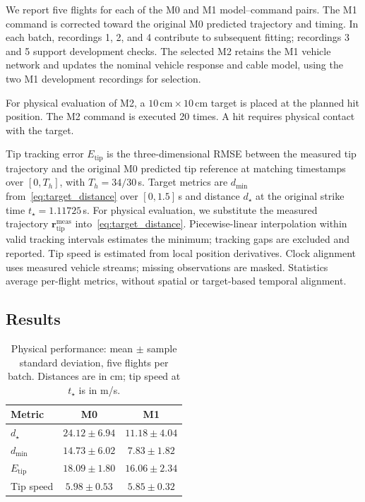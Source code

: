 \documentclass[letterpaper, 10 pt, conference]{ieeeconf}
\begin{document}
We report five flights for each of the M0 and M1 model--command
pairs. The M1 command is corrected toward the original M0
predicted trajectory and timing. In each batch, recordings 1, 2,
and 4 contribute to subsequent fitting; recordings 3 and 5 support
development checks. The selected M2 retains the M1 vehicle network
and updates the nominal vehicle response and cable model, using
the two M1 development recordings for selection.

For physical evaluation of M2, a $10\,\mathrm{cm}\times
10\,\mathrm{cm}$ target is placed at the planned hit position.
The M2 command is executed 20 times. A hit requires physical
contact with the target.

Tip tracking error $E_{\mathrm{tip}}$ is the three-dimensional
RMSE between the measured tip trajectory and the original M0
predicted tip reference at matching timestamps over $[0,T_h]$,
with $T_h=34/30$\,s.
Target metrics are $d_{\min}$ from~\eqref{eq:target_distance}
over $[0,1.5]$\,s and distance $d_\star$ at the original
strike time $t_\star=1.11725$\,s.
For physical evaluation, we substitute the measured trajectory
$\mathbf r_{\mathrm{tip}}^{\mathrm{meas}}$ into~\eqref{eq:target_distance}.
Piecewise-linear interpolation within valid tracking intervals
estimates the minimum; tracking gaps are excluded and reported.
Tip speed is estimated from local position derivatives. Clock alignment uses measured
vehicle streams; missing observations are masked. Statistics
average per-flight metrics, without spatial or target-based
temporal alignment.

\subsection{Results}
\label{subsec:physical_results}
\label{subsec:prediction_results}

\begin{table}[t]
\centering
\caption{Physical performance: mean $\pm$ sample standard
deviation, five flights per batch. Distances are in cm;
tip speed at $t_\star$ is in m/s.}
\label{tab:physical_performance}
\small
\setlength{\tabcolsep}{3pt}
\begin{tabular}{@{}lcc@{}}
\toprule
Metric & M0 & M1 \\
\midrule
$d_\star$ & $24.12\pm6.94$ & $11.18\pm4.04$ \\
$d_{\min}$ & $14.73\pm6.02$ & $7.83\pm1.82$ \\
$E_{\mathrm{tip}}$ & $18.09\pm1.80$ & $16.06\pm2.34$ \\
Tip speed & $5.98\pm0.53$ & $5.85\pm0.32$ \\
\bottomrule
\end{tabular}
\end{table}
\end{document}
